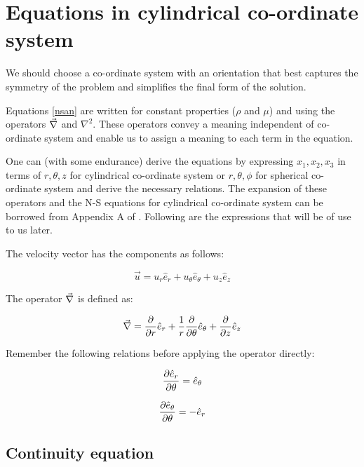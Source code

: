\section{Equations in cylindrical co-ordinate system}

We should choose a co-ordinate system with an orientation that best captures the symmetry of the problem and simplifies the final form of the solution.

Equations \ref{nsan} are written for constant properties ($\rho$ and $\mu$) and using the operators $\vec{\nabla}$ and $\nabla^2$. These operators convey a meaning independent of co-ordinate system and enable us to assign a meaning to each term in the equation. 

One can (with some endurance) derive the equations by expressing $x_1, x_2, x_3$ in terms of $r, \theta, z$ for cylindrical co-ordinate system or $r, \theta, \phi$ for spherical co-ordinate system and derive the necessary relations. The expansion of these operators and the N-S equations for cylindrical co-ordinate system can be borrowed from Appendix A of \cite{bls}. Following are the expressions that will be of use to us later. 

The velocity vector has the components as follows:

\begin{equation}
\vec{u} = u_r \hat{e}_r + u_\theta \hat{e}_\theta + u_z \hat{e}_z
\end{equation}

The operator $\vec{\nabla}$ is defined as:

\begin{equation}
\vec{\nabla} = \frac{\partial}{\partial r} \hat{e}_r + \frac{1}{r} \frac{\partial}{\partial \theta} \hat{e}_\theta + \frac{\partial}{\partial z} \hat{e}_z
\end{equation}

Remember the following relations before applying the operator directly:

\begin{equation}
{\partial \hat{e}_r \over \partial \theta} = \hat{e}_\theta
\end{equation}

\begin{equation}
{\partial \hat{e}_\theta \over \partial \theta} = -\hat{e}_r
\end{equation}

\subsection{Continuity equation}

